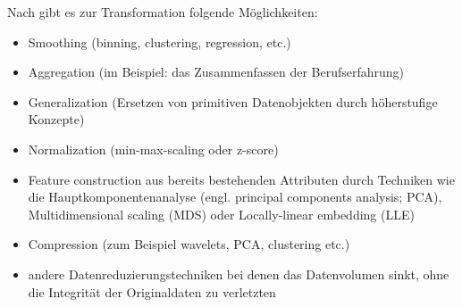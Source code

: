 Nach \citep[S.~71; veränderte Version]{swamynathan_mastering_2017} gibt es zur Transformation folgende Möglichkeiten:
\begin{itemize}
\item Smoothing (binning, clustering, regression, etc.)
\item Aggregation (im Beispiel: das Zusammenfassen der Berufserfahrung)
\item Generalization (Ersetzen von primitiven Datenobjekten durch höherstufige Konzepte)
\item Normalization (min-max-scaling oder z-score)
\item Feature construction aus bereits bestehenden Attributen durch Techniken wie die Hauptkomponentenanalyse (engl. principal components analysis; PCA), Multidimensional scaling (MDS) oder Locally-linear embedding (LLE)
\item Compression (zum Beispiel wavelets, PCA, clustering etc.)
\item andere Datenreduzierungstechniken bei denen das Datenvolumen sinkt, ohne die Integrität der Originaldaten zu verletzten
\end{itemize}


